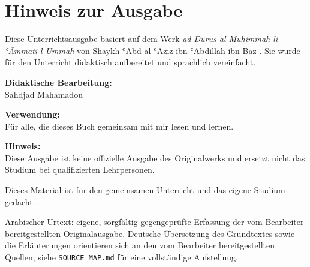 \clearpage
\thispagestyle{plain}
\section*{Hinweis zur Ausgabe}

Diese Unterrichtsausgabe basiert auf dem Werk \emph{ad-Durūs al-Muhimmah li-ʿĀmmati l-Ummah}
von Shaykh ʿAbd al-ʿAzīz ibn ʿAbdillāh ibn Bāz . Sie wurde für den Unterricht
didaktisch aufbereitet und sprachlich vereinfacht.

\vspace{1em}
\textbf{Didaktische Bearbeitung:}\\
Sahdjad Mahamadou

\vspace{1em}
\textbf{Verwendung:}\\
Für alle, die dieses Buch gemeinsam mit mir lesen und lernen.

\vspace{1em}
\textbf{Hinweis:}\\
Diese Ausgabe ist keine offizielle Ausgabe des Originalwerks und ersetzt nicht das Studium bei
qualifizierten Lehrpersonen.

\vspace{1em}
Dieses Material ist für den gemeinsamen Unterricht und das eigene Studium gedacht.

\vspace{2em}
{\small\color{MutedText}
Arabischer Urtext: eigene, sorgfältig gegengeprüfte Erfassung der vom Bearbeiter bereitgestellten
Originalausgabe. Deutsche Übersetzung des Grundtextes sowie die Erläuterungen orientieren sich
an den vom Bearbeiter bereitgestellten Quellen; siehe \texttt{SOURCE\_MAP.md} für eine
vollständige Aufstellung.}
\clearpage
